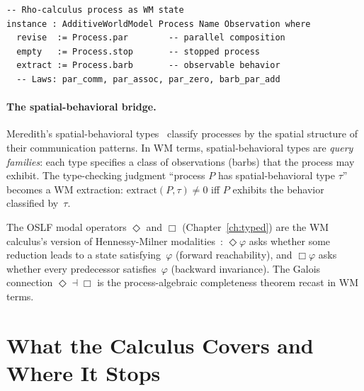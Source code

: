 \begin{lstlisting}[language={}]
-- Rho-calculus process as WM state
instance : AdditiveWorldModel Process Name Observation where
  revise  := Process.par        -- parallel composition
  empty   := Process.stop       -- stopped process
  extract := Process.barb       -- observable behavior
  -- Laws: par_comm, par_assoc, par_zero, barb_par_add
\end{lstlisting}

\paragraph{The spatial-behavioral bridge.}
Meredith's spatial-behavioral types~\cite{meredith2026ccc} classify
processes by the spatial structure of their communication patterns.
In WM terms, spatial-behavioral types are \emph{query families}:
each type specifies a class of observations (barbs) that the process
may exhibit.  The type-checking judgment ``process $P$ has
spatial-behavioral type $\tau$'' becomes a WM extraction:
$\mathrm{extract}(P, \tau) \ne 0$ iff $P$ exhibits the behavior
classified by~$\tau$.

The OSLF modal operators $\Diamond$ and $\Box$
(Chapter~\ref{ch:typed}) are the WM calculus's version of
Hennessy-Milner modalities~\cite{HennessyMilner1985}: $\Diamond\varphi$
asks whether some reduction leads to a state satisfying~$\varphi$
(forward reachability), and $\Box\varphi$ asks whether every
predecessor satisfies~$\varphi$ (backward invariance).  The Galois
connection $\Diamond \dashv \Box$ is the process-algebraic
completeness theorem recast in WM terms.



\section{What the Calculus Covers and Where It Stops}
\label{sec:bridge-scope}

